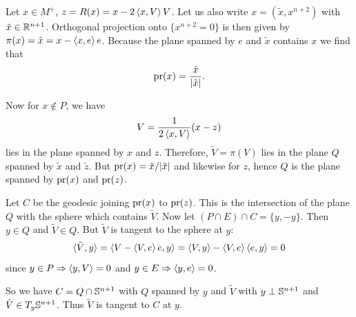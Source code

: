 \documentclass{amsart}
\begin{document}
Let \(x \in M^+\), \(z = R(x) = x - 2\inpr{x}{V} V\). Let us also write \(x = (\tilde{x}, x^{n+2})\) with \(\tilde{x} \in \R^{n+1}\). Orthogonal projection onto \(\{x^{n+2} = 0\}\) is then given by \(\pi (x) = \tilde{x} = x - \inpr{x}{e} e\). Because the plane spanned by \(e\) and \(\tilde{x}\) contains \(x\) we find that
\[
\pr (x) = \frac{\tilde{x}}{|\tilde{x}|}.
\]

Now for \(x \notin P\), we have
\[
V = \frac{1}{2\inpr{x}{V}} (x - z)
\]
lies in the plane spanned by \(x\) and \(z\). Therefore, \(\tilde V = \pi(V)\) lies in the plane \(Q\) spanned by \(\tilde{x}\) and \(\tilde{z}\). But \(\pr(x) = \tilde{x}/|\tilde{x}|\) and likewise for \(z\), hence \(Q\) is the plane spanned by \(\pr(x)\) and \(\pr(z)\).

Let \(C\) be the geodesic joining \(\pr(x)\) to \(\pr(z)\). This is the intersection of the plane \(Q\) with the sphere which contains \(\tilde{V}\). Now let \((P \cap E) \cap C = \{y,-y\}\). Then \(y \in Q\) and \(\tilde{V} \in Q\). But \(\tilde{V}\) is tangent to the sphere at \(y\):
\[
\langle \tilde{V},y \rangle = \inpr{V - \inpr{V}{e}e}{y} = \inpr{V}{y} - \inpr{V}{e} \inpr{e}{y} = 0
\]
since \(y \in P \Rightarrow \inpr{y}{V} = 0\) and \(y \in E \Rightarrow \inpr{y}{e} = 0\).

So we have \(C = Q \cap \S^{n+1}\) with \(Q\) spanned by \(y\) and \(\tilde{V}\) with \(y\perp \S^{n+1}\) and \(\tilde{V} \in T_y \S^{n+1}\). Thus \(\tilde{V}\) is tangent to \(C\) at \(y\).
\end{document}
